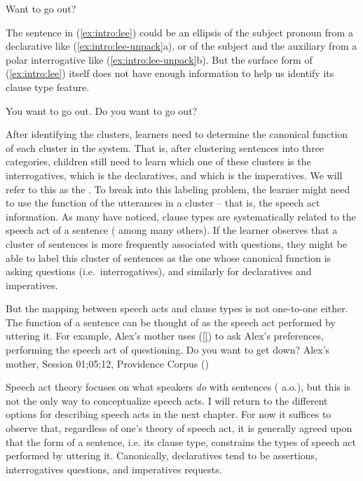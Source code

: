 {
Want to go out?
\eex

The sentence in (\ref{ex:intro:lee}) could be an ellipsis of  the subject pronoun from a declarative like (\ref{ex:intro:lee-unpack}a), or of the subject and the auxiliary from a polar interrogative like (\ref{ex:intro:lee-unpack}b). But the surface form of (\ref{ex:intro:lee}) itself does not have enough information to help us identify its clause type feature. 

\bxl
You want to go out.
\ex Do you want to go out?
\exl
\eex


%

After identifying the clusters, learners need to determine the canonical function of each cluster in the system. That is, after clustering sentences into three categories, children still need to learn which one of these clusters is the interrogatives, which is the declaratives, and which is the imperatives. We will refer to this as the . To break into this labeling problem, the learner might need to use the function of the utterances in a cluster -- that is, the speech act information. As many have noticed, clause types are systematically related to the speech act of a sentence (\cite{katzpostal1964, sz1985speechact, portner2018} among many others). If the learner observes that a cluster of sentences is more frequently associated with questions, they might be able to label this cluster of sentences as the one whose canonical function is asking questions (i.e.\ interrogatives), and similarly for declaratives and imperatives. 

But the mapping between speech acts and clause types is not one-to-one either. The function of a sentence can be thought of as the speech act performed by uttering it. For example, Alex's mother uses (\ref{}) to ask Alex's preferences, performing the speech act of questioning.
\bex{}
Do you want to get down? \hfill Alex's mother, Session 01;05;12, Providence Corpus (\cite{ProvidenceCorpus})
\eex

Speech act theory focuses on what speakers \emph{do} with sentences (\cite{austin1975things, searle1969} a.o.), but this is not the only way to conceptualize speech acts. I will return to the different options for describing speech acts in the next chapter. For now it suffices to observe that, regardless of one's theory of speech act, it is generally agreed upon that the form of a sentence, i.e. its clause type, constrains the types of speech act performed by uttering it. Canonically, declaratives tend to be assertions, interrogatives questions, and imperatives requests. 


}
